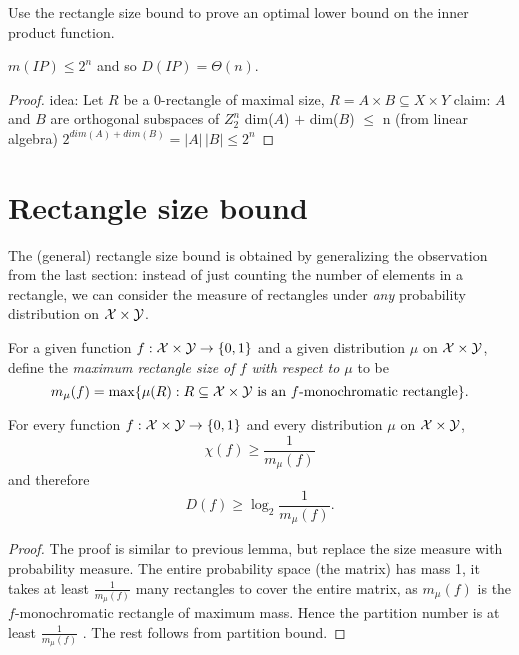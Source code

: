 Use the rectangle size bound to prove an optimal lower bound on the inner product function.

\begin{theorem}
$m(IP) \le 2^{n}$ and so $D(IP) = \Theta(n)$.
\end{theorem}

\begin{proof}
idea: Let $R$ be a 0-rectangle of maximal size, $R = A \times B \subseteq X \times Y$
claim: $A$ and $B$ are orthogonal subspaces of $Z_2^n$
dim($A$) $+$ dim($B$) $\le$ n (from linear algebra)
$2^{dim(A) + dim(B)} = |A|\, |B| \le 2^n$
\end{proof}


\newpage \section{Rectangle size bound}

The (general) rectangle size bound is obtained by generalizing the observation from the last section: instead of just counting the number of elements in a rectangle, we can consider the measure of rectangles under \emph{any} probability distribution on $\mathcal{X} \times \mathcal{Y}$.

\begin{definition}[$m_\mu(f)$]
For a given function $f : \mathcal{X} \times \mathcal{Y} \to \{0,1\}$ and a given distribution $\mu$ on $\mathcal{X} \times \mathcal{Y}$, define the \emph{maximum rectangle size of $f$ with respect to $\mu$} to be
\[
m_\mu(f) = \max \{ \mu(R) : R \subseteq \mathcal{X} \times \mathcal{Y} \mbox{ is an $f$-monochromatic rectangle} \}.
\]
\end{definition}


\begin{lemma}
For every function $f : \mathcal{X} \times \mathcal{Y} \to \{0,1\}$ and every distribution $\mu$ on $\mathcal{X} \times \mathcal{Y}$, 
\[
\chi(f) \ge \frac1{m_\mu(f)}
\]
and therefore
\[
D(f) \ge \log_2 \frac{1}{m_\mu(f)}.
\]
\end{lemma}

\begin{proof}
The proof is similar to previous lemma, but replace the size measure with probability measure. The entire probability space (the matrix) has mass 1, it takes at least $\frac1{m_\mu(f)}$ many rectangles to cover the entire matrix, as $m_\mu(f)$ is the $f$-monochromatic rectangle of maximum mass. Hence the partition number is at least $\frac1{m_\mu(f)}$ . The rest follows from partition bound.
\end{proof}


